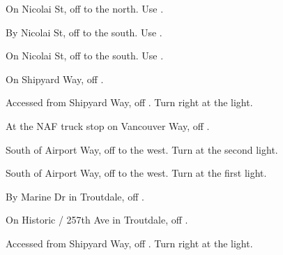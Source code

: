 

\begin{LocationList}

On Nicolai St, off  to the north. Use  .

By Nicolai St, off  to the south. Use  .

\Location{\GarageHQ \Garage}
On Nicolai St, off  to the south. Use  .

On Shipyard Way, off  .

Accessed from Shipyard Way, off  . Turn right at the light.

At the NAF truck stop on Vancouver Way, off  .

South of Airport Way, off   to the west. Turn at the second light.

South of Airport Way, off   to the west. Turn at the first light.

By Marine Dr in Troutdale, off  .

On Historic  / 257th Ave in Troutdale, off  .

Accessed from Shipyard Way, off  . Turn right at the light.

\end{LocationList}
